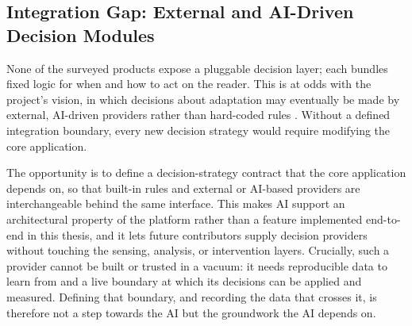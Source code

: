 \subsection{Integration Gap: External and AI-Driven Decision Modules}
\label{subsec:gap-integration}
None of the surveyed products expose a pluggable decision layer; each bundles fixed logic for when and how to act on the reader.
This is at odds with the project's vision, in which decisions about adaptation may eventually be made by external, AI-driven providers rather than hard-coded rules \cite{dtucompute2025rtr}.
Without a defined integration boundary, every new decision strategy would require modifying the core application.

The opportunity is to define a decision-strategy contract that the core application depends on, so that built-in rules and external or AI-based providers are interchangeable behind the same interface.
This makes AI support an architectural property of the platform rather than a feature implemented end-to-end in this thesis, and it lets future contributors supply decision providers without touching the sensing, analysis, or intervention layers.
Crucially, such a provider cannot be built or trusted in a vacuum: it needs reproducible data to learn from and a live boundary at which its decisions can be applied and measured.
Defining that boundary, and recording the data that crosses it, is therefore not a step towards the AI but the groundwork the AI depends on.
